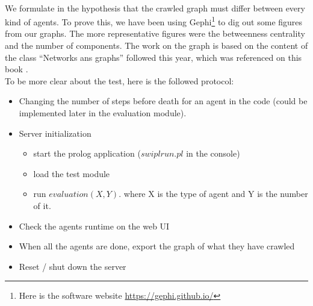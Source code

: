 \documentclass{article}
\newenvironment{itemh}[0]{\begin{itemize}[font=\color{mygray} \small]}{\end{itemize}}
\newenvironment{itemH}[0]{\begin{itemize}[font=\color{mygray} \large]}{\end{itemize}}
\begin{document}
		\paragraph{}
			We formulate in the hypothesis that the crawled graph must differ between every kind of agents.
			To prove this, we have been using Gephi\footnote{
				Here is the software website \url{https://gephi.github.io/}
			} to dig out some figures from our graphs.
			The more representative figures were the betweenness centrality and the number of components.
			The work on the graph is based on the content of the class ``Networks ans graphs'' followed this year,
			which was referenced on this book \cite{Steen10}.\\
		\newline
			To be more clear about the test, here is the followed protocol:
			\begin{itemH}
				\item Changing the number of steps before death for an agent in the code
				(could be implemented later in the evaluation module).
				\item Server initialization
				\begin{itemh}
					\item start the prolog application ($swipl run.pl$ in the console)
					\item load the test module
					\item run $evaluation(X,Y).$ where X is the type of agent and Y is the number of it.
				\end{itemh}
				\item Check the agents runtime on the web UI
				\item When all the agents are done, export the graph of what they have crawled
				\item Reset / shut down the server
			\end{itemH}
\end{document}
